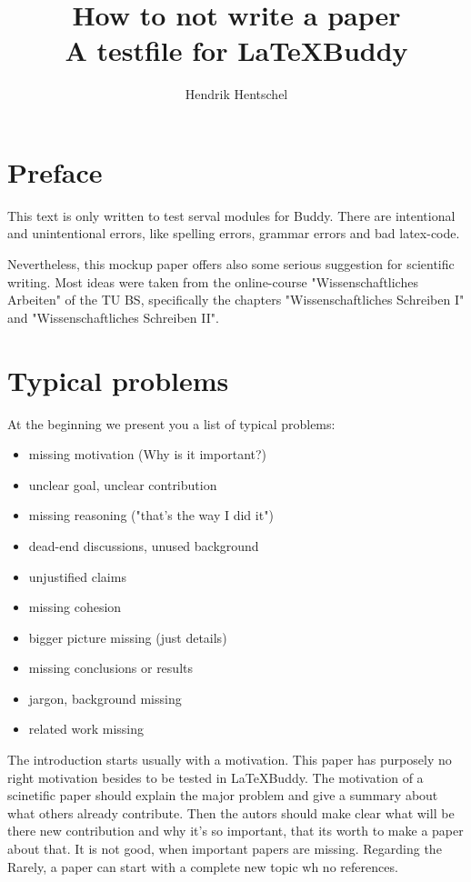 \documentclass[12pt,a4paper]{article}
\begin{document}
\title{\Large \bf How to not write a paper\\ \Large A testfile for \LaTeX{}Buddy}
\author{Hendrik Hentschel}
\maketitle %
\section*{Preface}
This text is only written to test serval modules for \Latex{}Buddy. There are intentional and unintentional errors, like spelling errors, grammar errors and bad latex-code.

Nevertheless, this mockup paper offers also some serious suggestion for scientific writing. Most ideas were taken from the online-course "Wissenschaftliches Arbeiten" of the TU BS, specifically the chapters "Wissenschaftliches Schreiben I" and "Wissenschaftliches Schreiben II".

\section{Typical problems}
At the beginning we present you a list of typical problems:
\begin{itemize}
    \item missing motivation (Why is it important?)
    \item unclear goal, unclear contribution
    \item missing reasoning ("that's the way I did it")
    \item dead-end discussions, unused background
    \item unjustified claims
    \item missing cohesion
    \item bigger picture missing (just details)
    \item missing conclusions or results
    \item jargon, background missing
    \item related work missing
\end{itemize}

The introduction starts usually with a motivation. This paper has purposely no right motivation besides to be tested in \LaTeX{}Buddy. The motivation of a scinetific paper should explain the major problem and give a summary about what others already contribute. Then the autors should make clear what will be there new contribution and why it's so important, that its worth to make a paper about that.
It is not good, when important papers are missing. Regarding the Rarely, a paper can start with a complete new topic wh no references. 
\end{document}
